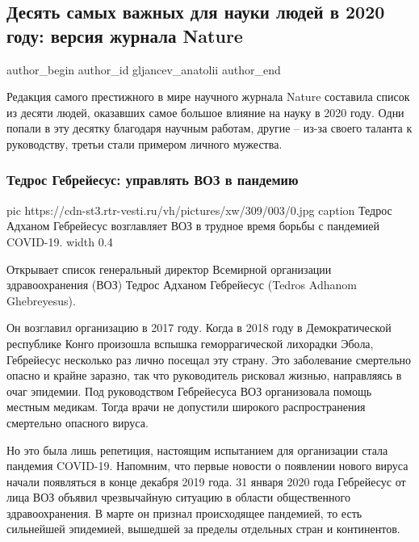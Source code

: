  
 
 
 
 
 
\subsection{Десять самых важных для науки людей в 2020 году: версия журнала Nature}
\label{sec:31_12_2020.news.ru.vesti.gljancev_anatolii.1.desjat_samyh_vazhnyh_ljudej_dlja_nauki}
\ifcmt
	author_begin
   author_id gljancev_anatolii
	author_end
\fi

Редакция самого престижного в мире научного журнала Nature составила список из
десяти людей, оказавших самое большое влияние на науку в 2020 году. Одни попали
в эту десятку благодаря научным работам, другие – из-за своего таланта к
руководству, третьи стали примером личного мужества.

\subsubsection{Тедрос Гебрейесус: управлять ВОЗ в пандемию}

\ifcmt
  pic https://cdn-st3.rtr-vesti.ru/vh/pictures/xw/309/003/0.jpg
	caption Тедрос Адханом Гебрейесус возглавляет ВОЗ в трудное время борьбы с пандемией COVID-19.
  width 0.4
\fi

Открывает список генеральный директор Всемирной организации здравоохранения
(ВОЗ) Тедрос Адханом Гебрейесус (Tedros Adhanom Ghebreyesus).

Он возглавил организацию в 2017 году. Когда в 2018 году в Демократической
республике Конго произошла вспышка геморрагической лихорадки Эбола, Гебрейесус
несколько раз лично посещал эту страну. Это заболевание смертельно опасно и
крайне заразно, так что руководитель рисковал жизнью, направляясь в очаг
эпидемии. Под руководством Гебрейесуса ВОЗ организовала помощь местным медикам.
Тогда врачи не допустили широкого распространения смертельно опасного вируса.

Но это была лишь репетиция, настоящим испытанием для организации стала пандемия
COVID-19. Напомним, что первые новости о появлении нового вируса начали
появляться в конце декабря 2019 года. 31 января 2020 года Гебрейесус от лица
ВОЗ объявил чрезвычайную ситуацию в области общественного здравоохранения. В
марте он признал происходящее пандемией, то есть сильнейшей эпидемией, вышедшей
за пределы отдельных стран и континентов.

